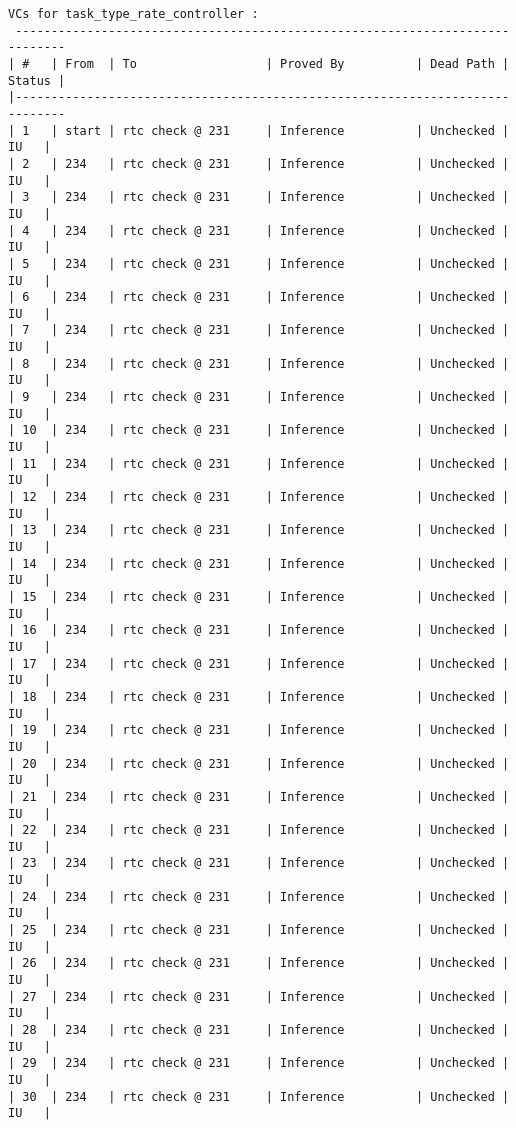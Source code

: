 \begin{lstlisting}[frame=single, gobble=0, caption={POGS report for PCA Pump prototype}]
VCs for task_type_rate_controller :
 -----------------------------------------------------------------------------
| #   | From  | To                  | Proved By          | Dead Path | Status |
|-----------------------------------------------------------------------------
| 1   | start | rtc check @ 231     | Inference          | Unchecked |   IU   |
| 2   | 234   | rtc check @ 231     | Inference          | Unchecked |   IU   |
| 3   | 234   | rtc check @ 231     | Inference          | Unchecked |   IU   |
| 4   | 234   | rtc check @ 231     | Inference          | Unchecked |   IU   |
| 5   | 234   | rtc check @ 231     | Inference          | Unchecked |   IU   |
| 6   | 234   | rtc check @ 231     | Inference          | Unchecked |   IU   |
| 7   | 234   | rtc check @ 231     | Inference          | Unchecked |   IU   |
| 8   | 234   | rtc check @ 231     | Inference          | Unchecked |   IU   |
| 9   | 234   | rtc check @ 231     | Inference          | Unchecked |   IU   |
| 10  | 234   | rtc check @ 231     | Inference          | Unchecked |   IU   |
| 11  | 234   | rtc check @ 231     | Inference          | Unchecked |   IU   |
| 12  | 234   | rtc check @ 231     | Inference          | Unchecked |   IU   |
| 13  | 234   | rtc check @ 231     | Inference          | Unchecked |   IU   |
| 14  | 234   | rtc check @ 231     | Inference          | Unchecked |   IU   |
| 15  | 234   | rtc check @ 231     | Inference          | Unchecked |   IU   |
| 16  | 234   | rtc check @ 231     | Inference          | Unchecked |   IU   |
| 17  | 234   | rtc check @ 231     | Inference          | Unchecked |   IU   |
| 18  | 234   | rtc check @ 231     | Inference          | Unchecked |   IU   |
| 19  | 234   | rtc check @ 231     | Inference          | Unchecked |   IU   |
| 20  | 234   | rtc check @ 231     | Inference          | Unchecked |   IU   |
| 21  | 234   | rtc check @ 231     | Inference          | Unchecked |   IU   |
| 22  | 234   | rtc check @ 231     | Inference          | Unchecked |   IU   |
| 23  | 234   | rtc check @ 231     | Inference          | Unchecked |   IU   |
| 24  | 234   | rtc check @ 231     | Inference          | Unchecked |   IU   |
| 25  | 234   | rtc check @ 231     | Inference          | Unchecked |   IU   |
| 26  | 234   | rtc check @ 231     | Inference          | Unchecked |   IU   |
| 27  | 234   | rtc check @ 231     | Inference          | Unchecked |   IU   |
| 28  | 234   | rtc check @ 231     | Inference          | Unchecked |   IU   |
| 29  | 234   | rtc check @ 231     | Inference          | Unchecked |   IU   |
| 30  | 234   | rtc check @ 231     | Inference          | Unchecked |   IU   |

\end{lstlisting}
